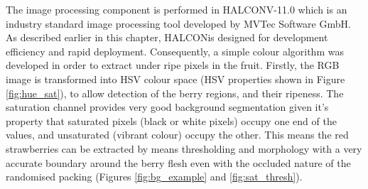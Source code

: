 \documentclass[fleqn,twoside,12pt]{report}
\begin{document}
The image processing component is performed in  HALCON\texttrademark V-11.0 which is an industry standard image processing tool developed by MVTec Software GmbH\texttrademark. As described earlier in this chapter, HALCON\texttrademark is designed for development efficiency and rapid deployment. Consequently, a simple colour algorithm was developed in order to extract under ripe pixels in the fruit. Firstly, the RGB image is transformed into HSV colour space (HSV properties shown in Figure \ref{fig:hue_sat}), to allow detection of the berry regions, and their ripeness. The saturation channel provides very good background segmentation given it's property that saturated pixels (black or white pixels) occupy one end of the values, and unsaturated (vibrant colour) occupy the other. This means the red strawberries can be extracted by means thresholding and morphology with a very accurate boundary around the berry flesh even with the occluded nature of the randomised packing (Figures \ref{fig:bg_example} and \ref{fig:sat_thresh}).
\end{document}
